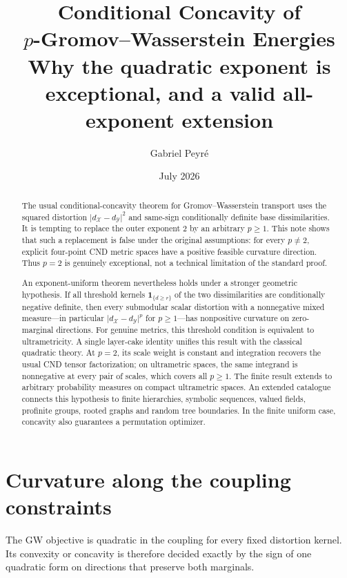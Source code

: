 \documentclass[11pt,a4paper]{article}
\title{\textbf{Conditional Concavity of\\
\(p\)-Gromov--Wasserstein Energies}\\
\large Why the quadratic exponent is exceptional, and a valid all-exponent extension}
\author{Gabriel Peyr\'e}
\date{July 2026}
\theoremstyle{definition}
\theoremstyle{remark}
\begin{document}
\maketitle

\begin{abstract}
The usual conditional-concavity theorem for Gromov--Wasserstein transport
uses the squared distortion
\(\lvert d_{\mathcal X}-d_{\mathcal Y}\rvert^2\) and same-sign
conditionally definite base dissimilarities.  It is tempting to replace the
outer exponent \(2\) by an arbitrary \(p\geq1\).  This note shows that such a
replacement is false under the original assumptions: for every
\(p\neq2\), explicit four-point CND metric spaces have a positive feasible
curvature direction.  Thus \(p=2\) is genuinely exceptional, not a
technical limitation of the standard proof.

An exponent-uniform theorem nevertheless holds under a stronger geometric
hypothesis.  If all threshold kernels
\(\mathbf 1_{\{d\geq r\}}\) of the two dissimilarities are conditionally
negative definite, then every submodular scalar distortion with a nonnegative
mixed measure---in particular \(\lvert d_{\mathcal X}-d_{\mathcal Y}\rvert^p\)
for \(p\geq1\)---has nonpositive curvature on zero-marginal directions.  For
genuine metrics, this threshold condition is equivalent to ultrametricity.
A single layer-cake identity unifies this result with the classical quadratic
theory.  At \(p=2\), its scale weight is constant and integration recovers the
usual CND tensor factorization; on ultrametric spaces, the same integrand is
nonnegative at every pair of scales, which covers all \(p\geq1\).  The finite
result extends to arbitrary probability measures on compact ultrametric
spaces.  An extended catalogue connects this hypothesis to finite
hierarchies, symbolic sequences, valued fields, profinite groups, rooted
graphs and random tree boundaries.  In the finite uniform case, concavity
also guarantees a permutation optimizer.
\end{abstract}

\section{Curvature along the coupling constraints}
\label{sec:setup}

The GW objective is quadratic in the coupling for every fixed distortion
kernel.  Its convexity or concavity is therefore decided exactly by the sign
of one quadratic form on directions that preserve both marginals.
\end{document}

